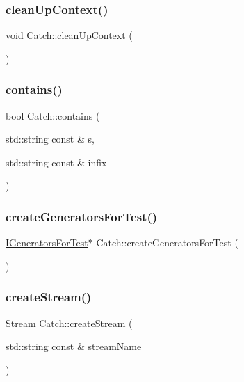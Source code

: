 \subsubsection{\texorpdfstring{clean\+Up\+Context()}{cleanUpContext()}}
{\footnotesize\ttfamily void Catch\+::clean\+Up\+Context (\begin{DoxyParamCaption}{ }\end{DoxyParamCaption})}

\hypertarget{namespace_catch_aa52974b0e426e7e2fbd725a900e9c36e}{}\label{namespace_catch_aa52974b0e426e7e2fbd725a900e9c36e} 
\subsubsection{\texorpdfstring{contains()}{contains()}}
{\footnotesize\ttfamily bool Catch\+::contains (\begin{DoxyParamCaption}\item[{std\+::string const \&}]{s,  }\item[{std\+::string const \&}]{infix }\end{DoxyParamCaption})}

\hypertarget{namespace_catch_a3d93b31e88fd01ee9e0d20757ff64eab}{}\label{namespace_catch_a3d93b31e88fd01ee9e0d20757ff64eab} 
\subsubsection{\texorpdfstring{create\+Generators\+For\+Test()}{createGeneratorsForTest()}}
{\footnotesize\ttfamily \hyperlink{struct_catch_1_1_i_generators_for_test}{I\+Generators\+For\+Test}$\ast$ Catch\+::create\+Generators\+For\+Test (\begin{DoxyParamCaption}{ }\end{DoxyParamCaption})}

\hypertarget{namespace_catch_ad7591011c5d99d59504ecd3384001c3e}{}\label{namespace_catch_ad7591011c5d99d59504ecd3384001c3e} 
\subsubsection{\texorpdfstring{create\+Stream()}{createStream()}}
{\footnotesize\ttfamily Stream Catch\+::create\+Stream (\begin{DoxyParamCaption}\item[{std\+::string const \&}]{stream\+Name }\end{DoxyParamCaption})}

